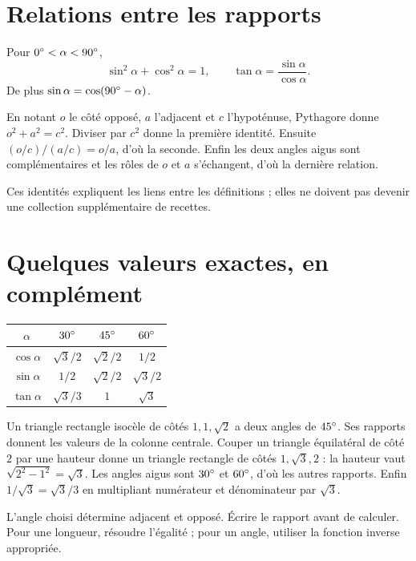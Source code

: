 \documentclass[../cours_3e.tex]{subfiles}
\begin{document}
\section{Relations entre les rapports}
\begin{propriete}
Pour $0^{\circ}<\alpha<90^{\circ}$,
\[\sin^2\alpha+\cos^2\alpha=1,\qquad
\tan\alpha=\frac{\sin\alpha}{\cos\alpha}.\]
De plus $\sin\alpha=\cos(90^{\circ}-\alpha)$.
\end{propriete}
\begin{demonstration}
En notant $o$ le côté opposé, $a$ l'adjacent et $c$ l'hypoténuse, Pythagore donne $o^2+a^2=c^2$. Diviser par $c^2$ donne la première identité. Ensuite $(o/c)/(a/c)=o/a$, d'où la seconde. Enfin les deux angles aigus sont complémentaires et les rôles de $o$ et $a$ s'échangent, d'où la dernière relation.
\end{demonstration}
Ces identités expliquent les liens entre les définitions ; elles ne doivent pas devenir une collection supplémentaire de recettes.
\section{Quelques valeurs exactes, en complément}
\begin{center}
\begin{tabular}{c|ccc}
\toprule $\alpha$&$30^{\circ}$&$45^{\circ}$&$60^{\circ}$\\\midrule
$\cos\alpha$&$\sqrt3/2$&$\sqrt2/2$&$1/2$\\
$\sin\alpha$&$1/2$&$\sqrt2/2$&$\sqrt3/2$\\
$\tan\alpha$&$\sqrt3/3$&$1$&$\sqrt3$\\\bottomrule
\end{tabular}
\end{center}
\begin{demonstration}
Un triangle rectangle isocèle de côtés $1,1,\sqrt2$ a deux angles de $45^{\circ}$. Ses rapports donnent les valeurs de la colonne centrale.
Couper un triangle équilatéral de côté $2$ par une hauteur donne un triangle rectangle de côtés $1,\sqrt3,2$ : la hauteur vaut $\sqrt{2^2-1^2}=\sqrt3$. Les angles aigus sont $30^{\circ}$ et $60^{\circ}$, d'où les autres rapports. Enfin $1/\sqrt3=\sqrt3/3$ en multipliant numérateur et dénominateur par $\sqrt3$.
\end{demonstration}
\begin{retenir}
L'angle choisi détermine adjacent et opposé. Écrire le rapport avant de calculer. Pour une longueur, résoudre l'égalité ; pour un angle, utiliser la fonction inverse appropriée.
\end{retenir}
\end{document}
